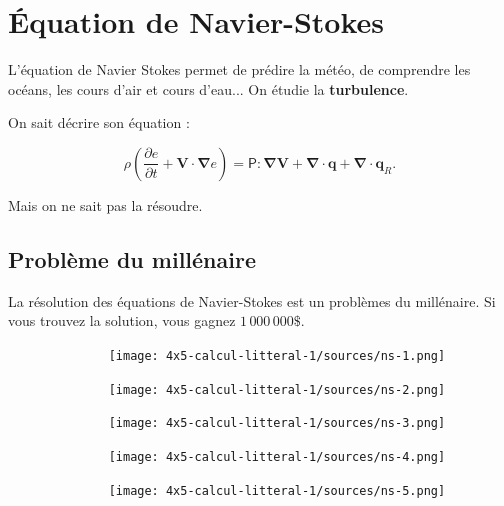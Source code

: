 \documentclass[12pt]{article}
\begin{document}
\setlength{\columnseprule}{1pt}

\section*{Équation de Navier-Stokes}

L'équation de Navier Stokes permet de prédire la météo, de comprendre les océans, les cours d'air et cours d'eau... On étudie la \textbf{turbulence}.

On sait décrire son équation : 

$$\rho \left({\dfrac {\partial e}{\partial t}}+\mathbf {V} \cdot \mathbf {\nabla } e\right)={\mathsf {P}}:\mathbf {\nabla } \mathbf {V} +\mathbf {\nabla } \cdot \mathbf {q} +\mathbf {\nabla } \cdot \mathbf {q} _{R}.$$

Mais on ne sait pas la résoudre.

\subsection*{Problème du millénaire}

La résolution des équations de Navier-Stokes est un problèmes du millénaire. Si vous trouvez la solution, vous gagnez $1 \, 000 \, 000\$ $. 

  \begin{figure}[H]
        \centering
        \texttt{[image: 4x5-calcul-litteral-1/sources/ns-1.png]}
  \end{figure}

\begin{multicols}{2}

  \begin{figure}[H]
        \centering
        \texttt{[image: 4x5-calcul-litteral-1/sources/ns-2.png]}
  \end{figure}
    \begin{figure}[H]
        \centering
        \texttt{[image: 4x5-calcul-litteral-1/sources/ns-3.png]}
  \end{figure}

\end{multicols}

\begin{multicols}{2}

    \begin{figure}[H]
        \centering
        \texttt{[image: 4x5-calcul-litteral-1/sources/ns-4.png]}
  \end{figure}

    \begin{figure}[H]
        \centering
        \texttt{[image: 4x5-calcul-litteral-1/sources/ns-5.png]}
  \end{figure}
\end{multicols}
\end{document}
